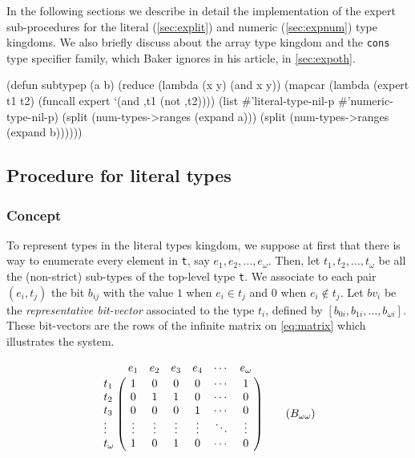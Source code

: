 \documentclass[format=sigconf]{acmart}
\newcommand\code[2][\small]{\sloppy\texttt{#1#2}}
\theoremstyle{definition}
\begin{document}
In the following sections we describe in detail the implementation of the expert
sub-procedures for the literal (\vref{sec:explit}) and numeric
(\vref{sec:expnum}) type kingdoms. We also briefly discuss
about the array type kingdom and the \code{cons} type specifier family,
which Baker ignores in his article, in \vref{sec:expoth}.

\begin{listing}
\begin{clcode}
(defun subtypep (a b)
  (reduce (lambda (x y) (and x y))
          (mapcar (lambda (expert t1 t2)
                    (funcall expert `(and ,t1 (not ,t2))))
                  (list #'literal-type-nil-p
                        #'numeric-type-nil-p)
                  (split (num-types->ranges (expand a)))
                  (split (num-types->ranges (expand b))))))
\end{clcode}
\caption{A top-down approach of \code{subtypep}}
\label{lst:tdstp}
\end{listing}

\subsection{Procedure for literal types}
\label{sec:explit}
\subsubsection{Concept}
To represent types in the literal types kingdom, we suppose at first that there
is way to enumerate every element in \code{t}, say $e_1, e_2, \dots, e_\omega$.
Then, let $t_1, t_2, \dots, t_\omega$ be all the (non-strict) sub-types of the
top-level type \code{t}. We associate to each pair $\left(e_i, t_j\right)$ the
bit $b_{ij}$ with the value $1$ when $e_i \in t_j$ and $0$ when $e_i \notin t_j$.
Let $bv_i$ be the \emph{representative bit-vector} associated to the type $t_i$,
defined by $\left[b_{0i}, b_{1i}, \dots, b_{\omega i}\right]$. These
bit-vectors are the rows of the infinite matrix on \vref{eq:matrix} which
illustrates the system.

\[
  \bordermatrix{
            &e_1   &e_2   &e_3    &e_4    &\cdots&e_\omega \cr
    t_1     &1     &0     &0      &0     &\cdots&1       \cr
    t_2     &0     &1     &1      &0     &\cdots&0       \cr
    t_3     &0     &0     &0      &1     &\cdots&0       \cr
    \vdots  &\vdots&\vdots&\vdots&\vdots&\ddots&\vdots  \cr
    t_\omega&1     &0     &1      &0     &\cdots&0
  } \label{eq:matrix} \tag{$B_{\omega\omega}$}
\]
\end{document}

